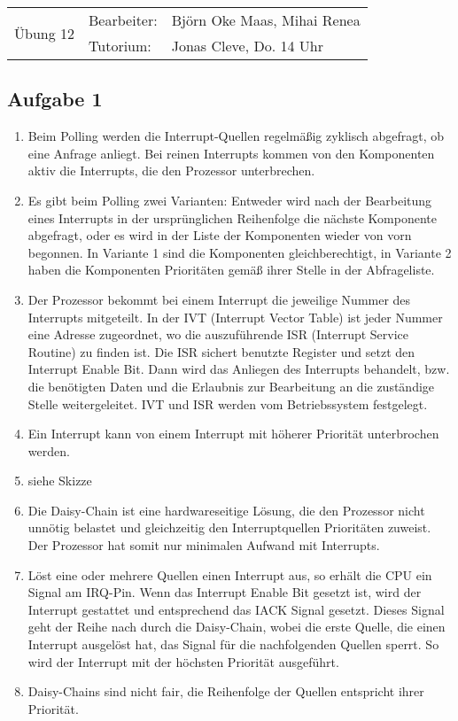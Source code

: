 \documentclass[paper=a4, english, ngerman]{scrartcl}
\begin{document}
	\begin{tabular}{p{8.5cm}ll}
		\multirow{2}{*}{\Huge{Übung 12} } & Bearbeiter: & Björn Oke Maas, Mihai Renea \\
		                                    & Tutorium:   & Jonas Cleve, Do. 14 Uhr     \\ \hline
	\end{tabular}
	
	\subsection*{Aufgabe 1}
\begin{enumerate}
	
	\item Beim Polling werden die Interrupt-Quellen regelmäßig zyklisch abgefragt, ob eine Anfrage anliegt. Bei reinen Interrupts kommen von den Komponenten aktiv die Interrupts, die den Prozessor unterbrechen.
	
	\item Es gibt beim Polling zwei Varianten: Entweder wird nach der Bearbeitung eines Interrupts in der ursprünglichen Reihenfolge die nächste Komponente abgefragt, oder es wird in der Liste der Komponenten wieder von vorn begonnen. In Variante 1 sind die Komponenten gleichberechtigt, in Variante 2 haben die Komponenten Prioritäten gemäß ihrer Stelle in der Abfrageliste.
	
	\item Der Prozessor bekommt bei einem Interrupt die jeweilige Nummer des Interrupts mitgeteilt. In der IVT (Interrupt Vector Table) ist jeder Nummer eine Adresse zugeordnet, wo die auszuführende ISR (Interrupt Service Routine) zu finden ist. Die ISR sichert benutzte Register und setzt den Interrupt Enable Bit. Dann wird das Anliegen des Interrupts behandelt, bzw. die benötigten Daten und die Erlaubnis zur Bearbeitung an die zuständige Stelle weitergeleitet. IVT und ISR werden vom Betriebssystem festgelegt.
	
	\item Ein Interrupt kann von einem Interrupt mit höherer Priorität unterbrochen werden.
	
	\item siehe Skizze
	
	\item Die Daisy-Chain ist eine hardwareseitige Lösung, die den Prozessor nicht unnötig belastet und gleichzeitig den Interruptquellen Prioritäten zuweist. Der Prozessor hat somit nur minimalen Aufwand mit Interrupts.
	
	\item Löst eine oder mehrere Quellen einen Interrupt aus, so erhält die CPU ein Signal am IRQ-Pin. Wenn das Interrupt Enable Bit gesetzt ist, wird der Interrupt gestattet und entsprechend das IACK Signal gesetzt. Dieses Signal geht der Reihe nach durch die Daisy-Chain, wobei die erste Quelle, die einen Interrupt ausgelöst hat, das Signal für die nachfolgenden Quellen sperrt. So wird der Interrupt mit der höchsten Priorität ausgeführt.
	
	\item Daisy-Chains sind nicht fair, die Reihenfolge der Quellen entspricht ihrer Priorität.
\end{enumerate}
\end{document}
